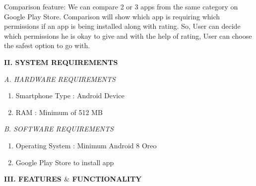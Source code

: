 \documentclass[12pt]{report}
\renewcommand{\_}{\kern-1.5pt\textunderscore\kern-1.5pt}
\begin{document}
\begin{multicols}{2}
\begin{justify}
\end{justify}
\begin{justify}
{\fontsize{10pt}{12.0pt}\selectfont Comparison feature: We can compare 2 or 3 apps from the same category on Google Play Store. Comparison will show which app is requiring which permissions if an app is being installed along with rating. So, User can decide which permissions he is okay to give and with the help of rating, User can choose the safest option to go with.\par}
\end{justify}

\vspace{\baselineskip}
\setlength{\parskip}{0.0pt}

\vspace{\baselineskip}
\begin{Center}
{\fontsize{10pt}{12.0pt}\selectfont \textbf{II. SYSTEM REQUIREMENTS}}
\end{Center}

\vspace{\baselineskip}
\begin{justify}
{\fontsize{10pt}{12.0pt}\selectfont \textit{A. HARDWARE REQUIREMENTS}}
\end{justify}
\begin{enumerate}
	\item {\fontsize{10pt}{12.0pt}\selectfont Smartphone Type : Android Device}
	\item {\fontsize{10pt}{12.0pt}\selectfont RAM : Minimum of 512 MB}
\end{enumerate}

\vspace{\baselineskip}
\begin{justify}
{\fontsize{10pt}{12.0pt}\selectfont \textit{B. SOFTWARE REQUIREMENTS}}
\end{justify}
\begin{enumerate}
	\item {\fontsize{10pt}{12.0pt}\selectfont Operating System : Minimum Android 8 Oreo}
	\item {\fontsize{10pt}{12.0pt}\selectfont Google Play Store to install app}
\end{enumerate}

\vspace{\baselineskip}

\vspace{\baselineskip}

\vspace{\baselineskip}
\begin{Center}
{\fontsize{10pt}{12.0pt}\selectfont \textbf{III. FEATURES $\&$  FUNCTIONALITY}}
\end{Center}


\end{multicols}
\end{document}
